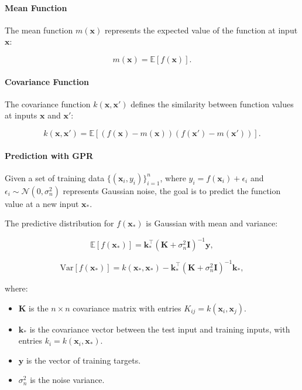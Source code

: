 \paragraph{Mean Function}

The mean function $m(\mathbf{x})$ represents the expected value of the function at input $\mathbf{x}$:

\begin{equation}
m(\mathbf{x}) = \mathbb{E}[f(\mathbf{x})].
\end{equation}

\paragraph{Covariance Function}

The covariance function $k(\mathbf{x}, \mathbf{x}')$ defines the similarity between function values at inputs $\mathbf{x}$ and $\mathbf{x}'$:

\begin{equation}
k(\mathbf{x}, \mathbf{x}') = \mathbb{E}\left[ (f(\mathbf{x}) - m(\mathbf{x}))(f(\mathbf{x}') - m(\mathbf{x}')) \right].
\end{equation}

\paragraph{Prediction with GPR}

Given a set of training data $\{ (\mathbf{x}_i, y_i) \}_{i=1}^n$, where $y_i = f(\mathbf{x}_i) + \epsilon_i$ and $\epsilon_i \sim \mathcal{N}(0, \sigma_n^2)$ represents Gaussian noise, the goal is to predict the function value at a new input $\mathbf{x}_*$.

The predictive distribution for $f(\mathbf{x}_*)$ is Gaussian with mean and variance:

\begin{equation}
\mathbb{E}[f(\mathbf{x}_*)] = \mathbf{k}_*^\top (\mathbf{K} + \sigma_n^2 \mathbf{I})^{-1} \mathbf{y},
\end{equation}

\begin{equation}
\mathrm{Var}[f(\mathbf{x}_*)] = k(\mathbf{x}_*, \mathbf{x}_*) - \mathbf{k}_*^\top (\mathbf{K} + \sigma_n^2 \mathbf{I})^{-1} \mathbf{k}_*,
\end{equation}

where:

\begin{itemize}
    \item $\mathbf{K}$ is the $n \times n$ covariance matrix with entries $K_{ij} = k(\mathbf{x}_i, \mathbf{x}_j)$.
    \item $\mathbf{k}_*$ is the covariance vector between the test input and training inputs, with entries $k_i = k(\mathbf{x}_i, \mathbf{x}_*)$.
    \item $\mathbf{y}$ is the vector of training targets.
    \item $\sigma_n^2$ is the noise variance.
\end{itemize}

